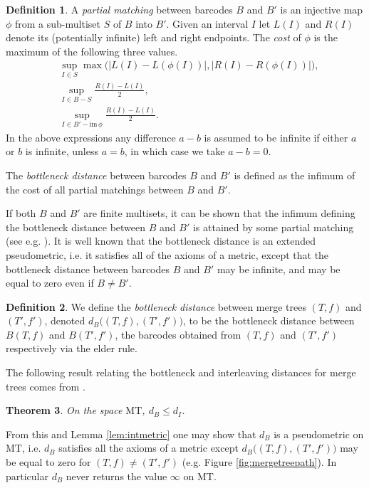 \documentclass{article}
\newtheorem{theorem}{Theorem}
\theoremstyle{definition}
\newtheorem{definition}[theorem]{Definition}
\newcommand{\im}{\mathrm{im}\,}
\newcommand{\MT}{\mathrm{MT}}
\begin{document}
\begin{definition}
    A \emph{partial matching} between barcodes $B$ and $B'$ is an injective map $\phi$ from a sub-multiset $S$ of $B$ into $B'$. Given an interval $I$ let $L(I)$ and $R(I)$ denote its (potentially infinite) left and right endpoints. The \emph{cost} of $\phi$ is the maximum of the following three values.
    \begin{align*}
        &\sup_{I\in S} \max\big(|L(I)-L(\phi(I))|, |R(I) - R(\phi(I))|\big),\\
        &\sup_{I \in B-S} \frac{R(I)- L(I)}{2}, \\
        &\sup_{I \in B' - \im\phi} \frac{R(I) -L(I)}{2}.
    \end{align*}
    In the above expressions any difference $a-b$ is assumed to be infinite if either $a$ or $b$ is infinite, unless $a=b$, in which case we take $a-b = 0$.

    The \emph{bottleneck distance} between barcodes $B$ and $B'$ is defined as the infimum of the cost of all partial matchings between $B$ and $B'$.
\end{definition}

If both $B$ and $B'$ are finite multisets, it can be shown that the infimum defining the bottleneck distance between $B$ and $B'$ is attained by some partial matching (see e.g. \cite{kerber2017geometry}). It is well known that the bottleneck distance is an extended pseudometric, i.e. it satisfies all of the axioms of a metric, except that the bottleneck distance between barcodes $B$ and $B'$ may be infinite, and may be equal to zero even if $B \neq B'$.

\begin{definition}
     We define the \emph{bottleneck distance} between merge trees $(T,f)$ and $(T',f')$, denoted $d_B\big((T,f),(T',f')\big)$, to be the bottleneck distance between $B(T,f)$ and $B(T',f')$, the barcodes obtained from $(T,f)$ and $(T',f')$ respectively via the elder rule.
\end{definition}

The following result relating the bottleneck and interleaving distances for merge trees comes from \cite[Theorem 3]{morozov2013interleaving}.

\begin{theorem}
    \label{thm:bottlelessthaninterleaving}
    On the space $\MT$, $d_B \leq d_I$.
\end{theorem}

From this and Lemma \ref{lem:intmetric} one may show that $d_B$ is a pseudometric on $\MT$, i.e. $d_B$ satisfies all the axioms of a metric except $d_B\big((T,f),(T',f')\big)$ may be equal to zero for $(T,f) \neq (T',f')$ (e.g. Figure \ref{fig:mergetreepath}). In particular $d_B$ never returns the value $\infty$ on $\MT$.
\end{document}
